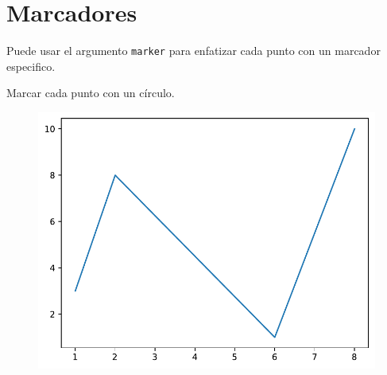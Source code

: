 \section{Marcadores}

Puede usar el argumento \texttt{marker} para enfatizar cada punto con un
marcador especifico.\\

\begin{code} Marcar cada punto con un círculo.

\begin{Shaded}
\begin{Highlighting}[]

\OperatorTok{=}\NormalTok{ np.array([}\NormalTok{, }\NormalTok{, }\NormalTok{, }\NormalTok{])}

\OperatorTok{=} \NormalTok{)}
\end{Highlighting}
\end{Shaded}

\begin{figure}
  \centering
  \includegraphics[scale=0.6]{img/grafica1004.pdf}
\end{figure}
\end{code}


